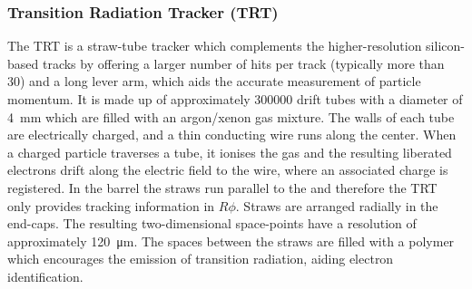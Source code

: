 \subsubsection{Transition Radiation Tracker (TRT)}
The TRT is a straw-tube tracker which complements the higher-resolution silicon-based tracks by offering a larger number of hits per track (typically more than 30) and a long lever arm, which aids the accurate measurement of particle momentum. 
It is made up of approximately \num{300000} drift tubes with a diameter of \SI{4}{\milli\meter} which are filled with an argon/xenon gas mixture.
The walls of each tube are electrically charged, and a thin conducting wire runs along the center.
When a charged particle traverses a tube, it ionises the gas and the resulting liberated electrons drift along the electric field to the wire, where an associated charge is registered.
In the barrel the straws run parallel to the  and therefore the TRT only provides tracking information in $R\phi$. Straws are arranged radially in the end-caps. The resulting two-dimensional space-points have a resolution of approximately \SI{120}{\micro\meter}.
The spaces between the straws are filled with a polymer which encourages the emission of transition radiation, aiding electron identification.





